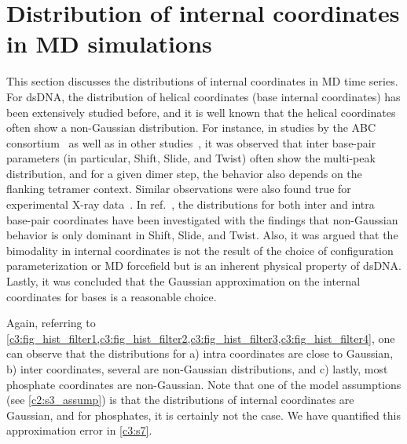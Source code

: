 \section{Distribution of internal coordinates in MD simulations}\label{c3:s6}
This section discusses the distributions of internal coordinates in MD time series. 
For dsDNA, the distribution of helical coordinates (base internal coordinates) has been extensively studied before, and it is well known that the helical coordinates often show a non-Gaussian distribution.
For instance, in studies by the ABC consortium~\cite{lavery2010systematic,pasi2014muabc,dixit2005molecular,beveridge2004molecular} as well as in other studies~\cite{perez2007dynamics,balaceanu2019modulation,dans2019static}, it was observed that inter base-pair parameters (in particular, Shift, Slide, and Twist) often show the multi-peak distribution, and for a given dimer step, the behavior also depends on the flanking tetramer context.
Similar observations were also found true for experimental X-ray data~\cite{maehigashi2012b,kielkopf2000conformational}.
In ref.~\cite{petthesis}, the distributions for both inter and intra base-pair coordinates have been investigated with the findings that non-Gaussian behavior is only dominant in Shift, Slide, and Twist.
Also, it was argued that the bimodality in internal coordinates is not the result of the choice of configuration parameterization or MD forcefield but is an inherent physical property of dsDNA.
Lastly, it was concluded that the Gaussian approximation on the internal coordinates for bases is a reasonable choice. 

Again, referring to \cref{c3:fig_hist_filter1,c3:fig_hist_filter2,c3:fig_hist_filter3,c3:fig_hist_filter4}, one can observe that the distributions for a) intra coordinates are close to Gaussian, b) inter coordinates, several are non-Gaussian distributions, and c) lastly, most phosphate coordinates are non-Gaussian.
Note that one of the model assumptions (see \cref{c2:s3_assump}) is that the distributions of internal coordinates are Gaussian, and for phosphates, it is certainly not the case. 
We have quantified this approximation error in \cref{c3:s7}.

